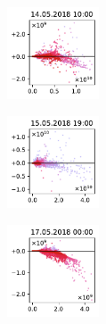 \begin{figure}[H]
    \centering
    \begin{subfigure}
        \centering
        \includegraphics[width=0.30\textwidth,valign=t]{evaluation/figures/perturbations/perturbation-14.05.2018:10.00-sesquiterpenes-mul-1.5.pdf}
    \end{subfigure}
    \begin{subfigure}
        \centering
        \includegraphics[width=0.30\textwidth,valign=t]{evaluation/figures/perturbations/perturbation-15.05.2018:19.00-sesquiterpenes-mul-1.5.pdf}
    \end{subfigure}
    \begin{subfigure}
        \centering
        \includegraphics[width=0.30\textwidth,valign=t]{evaluation/figures/perturbations/perturbation-17.05.2018:00.00-sesquiterpenes-mul-1.5.pdf}
    \end{subfigure}


\end{figure}
